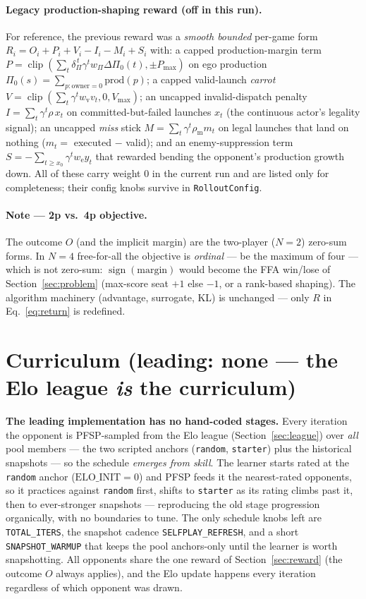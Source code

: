 \documentclass[11pt]{article}
\newcommand{\clip}{\operatorname{clip}}
\begin{document}
\paragraph{Legacy production-shaping reward (off in this run).} For reference, the previous reward was a
\emph{smooth bounded} per-game form $R_i=O_i+P_i+V_i-I_i-M_i+S_i$ with: a capped production-margin term
$P=\clip(\sum_t\delta_\Pi^{\,t}\gamma^t w_\Pi\Delta\Pi_0(t),\pm P_{\max})$ on ego production
$\Pi_0(s)=\sum_{p:\mathrm{owner}=0}\mathrm{prod}(p)$; a capped valid-launch \emph{carrot}
$V=\clip(\sum_t\gamma^t w_{\mathrm v}v_t,0,V_{\max})$; an uncapped invalid-dispatch penalty
$I=\sum_t\gamma^t\rho\,x_t$ on committed-but-failed launches $x_t$ (the continuous actor's legality
signal); an uncapped \emph{miss} stick $M=\sum_t\gamma^t\rho_{\mathrm m}m_t$ on legal launches that land
on nothing ($m_t=$ executed $-$ valid); and an enemy-suppression term
$S=-\sum_{t\ge x_0}\gamma^t w_{\mathrm e}y_t$ that rewarded bending the opponent's production growth
down. All of these carry weight $0$ in the current run and are listed only for completeness; their
config knobs survive in \texttt{RolloutConfig}.

\paragraph{Note --- 2p vs.\ 4p objective.} The outcome $O$ (and the implicit margin) are the
two-player ($N=2$) zero-sum forms. In $N=4$ free-for-all the objective is \emph{ordinal} --- be the
maximum of four --- which is not zero-sum: $\operatorname{sign}(\text{margin})$ would become the FFA
win/lose of Section~\ref{sec:problem} (max-score seat $+1$ else $-1$, or a rank-based shaping). The
algorithm machinery (advantage, surrogate, KL) is unchanged --- only $R$ in Eq.~\eqref{eq:return} is
redefined.

\section{Curriculum (leading: none --- the Elo league \emph{is} the curriculum)}\label{sec:curriculum}
\textbf{The leading implementation has no hand-coded stages.} Every iteration the opponent is
PFSP-sampled from the Elo league (Section~\ref{sec:league}) over \emph{all} pool members --- the two
scripted anchors (\texttt{random}, \texttt{starter}) plus the historical snapshots --- so the schedule
\emph{emerges from skill}. The learner starts rated at the \texttt{random} anchor ($\mathrm{ELO\_INIT}=0$)
and PFSP feeds it the nearest-rated opponents, so it practices against \texttt{random} first, shifts to
\texttt{starter} as its rating climbs past it, then to ever-stronger snapshots --- reproducing the old
stage progression organically, with no boundaries to tune. The only schedule knobs left are
\texttt{TOTAL\_ITERS}, the snapshot cadence \texttt{SELFPLAY\_REFRESH}, and a short
\texttt{SNAPSHOT\_WARMUP} that keeps the pool anchors-only until the learner is worth snapshotting. All
opponents share the one reward of Section~\ref{sec:reward} (the outcome $O$ always applies), and the Elo
update happens every iteration regardless of which opponent was drawn.
\end{document}
